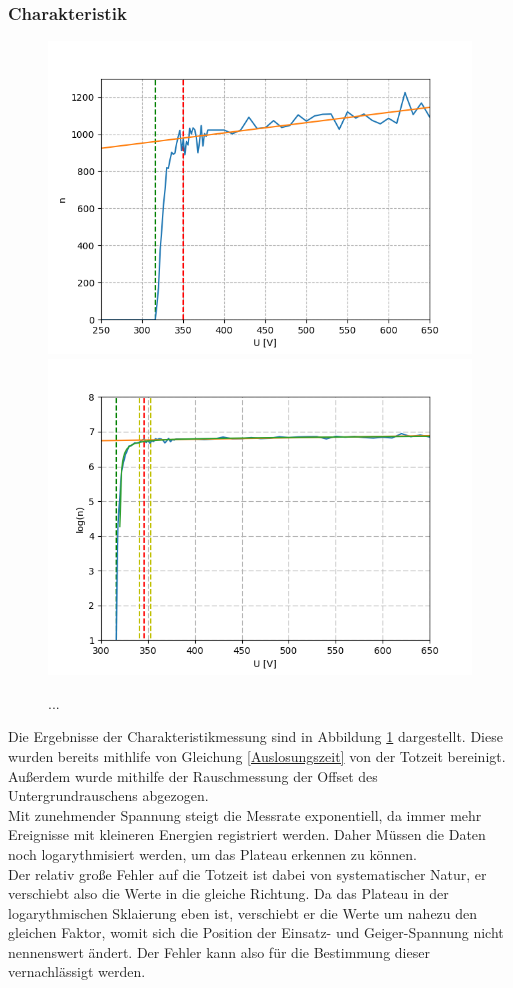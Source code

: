 \documentclass[12pt,a4paper]{article}
\begin{document}
\subsubsection{Charakteristik}
\label{GMchar}
\begin{figure}
\centering
\includegraphics[scale=1]{Bilder/GMlinear.PNG}
\includegraphics[scale=1]{Bilder/GMlog.PNG}
\caption{...}
\label{fig:GMCharakteristik}
\end{figure}
Die Ergebnisse der Charakteristikmessung sind in Abbildung \ref{fig:GMCharakteristik} dargestellt. Diese wurden bereits mithlife von Gleichung \ref{Auslosungszeit} von der Totzeit bereinigt.
Außerdem wurde mithilfe der Rauschmessung der Offset des Untergrundrauschens abgezogen.\\
Mit zunehmender Spannung steigt die Messrate exponentiell, da immer mehr Ereignisse mit kleineren Energien registriert werden. Daher Müssen die Daten noch logarythmisiert werden, um das Plateau erkennen zu können.\\
Der relativ große Fehler auf die Totzeit ist dabei von systematischer Natur, er verschiebt also die Werte in die gleiche Richtung. Da das Plateau in der logarythmischen Sklaierung eben ist, verschiebt er die Werte um nahezu den gleichen Faktor, womit sich die Position der Einsatz- und Geiger-Spannung nicht nennenswert ändert. Der Fehler kann also für die Bestimmung dieser vernachlässigt werden.
\end{document}
